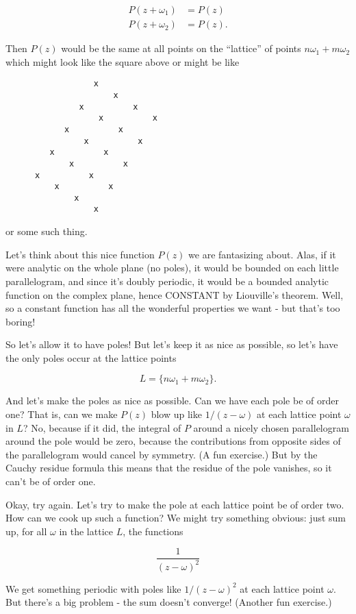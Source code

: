 \documentclass{article}
\begin{document}
\[\begin{aligned}P(z + \omega_1) &= P(z) \\ P(z + \omega_2) &= P(z).\end{aligned}\]

Then \(P(z)\) would be the same at all points on the ``lattice'' of
points \(n\omega_1 + m \omega_2\) which might look like the square above
or might be like

\begin{verbatim}
                  x
                      x
               x          x
                   x          x 
            x          x
                x          x
         x          x
             x          x
      x          x   
          x          x
              x 
                  x
\end{verbatim}

or some such thing.

Let's think about this nice function \(P(z)\) we are fantasizing about.
Alas, if it were analytic on the whole plane (no poles), it would be
bounded on each little parallelogram, and since it's doubly periodic, it
would be a bounded analytic function on the complex plane, hence
CONSTANT by Liouville's theorem. Well, so a constant function has all
the wonderful properties we want - but that's too boring!

So let's allow it to have poles! But let's keep it as nice as possible,
so let's have the only poles occur at the lattice points

\[L = \{n \omega_1 + m \omega_2\}.\]

And let's make the poles as nice as possible. Can we have each pole be
of order one? That is, can we make \(P(z)\) blow up like
\(1/(z - \omega)\) at each lattice point \(\omega\) in \(L\)? No,
because if it did, the integral of \(P\) around a nicely chosen
parallelogram around the pole would be zero, because the contributions
from opposite sides of the parallelogram would cancel by symmetry. (A
fun exercise.) But by the Cauchy residue formula this means that the
residue of the pole vanishes, so it can't be of order one.

Okay, try again. Let's try to make the pole at each lattice point be of
order two. How can we cook up such a function? We might try something
obvious: just sum up, for all \(\omega\) in the lattice \(L\), the
functions

\[\frac{1}{(z - \omega)^2}\]

We get something periodic with poles like \(1/(z - \omega)^2\) at each
lattice point \(\omega\). But there's a big problem - the sum doesn't
converge! (Another fun exercise.)
\end{document}
